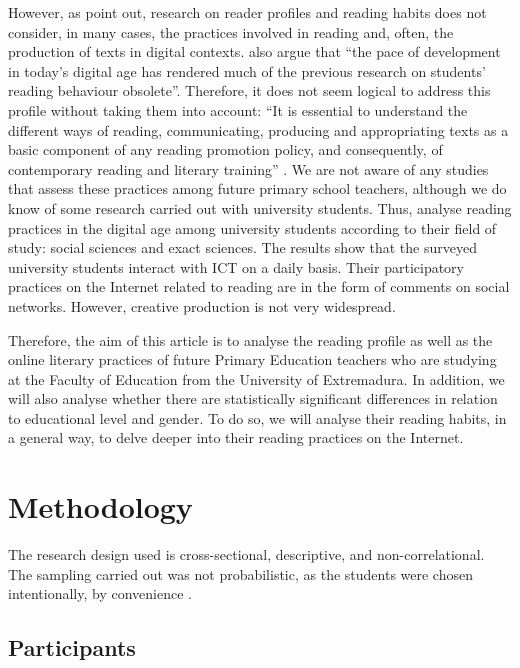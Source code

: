 \documentclass[english]{textolivre}
\begin{document}
However, as \textcite{ballester_educacion_2016} point out, research on reader profiles and reading habits does not consider, in many cases, the practices involved in reading and, often, the production of texts in digital contexts. \textcite[p. 585]{putro_profiles_2018} also argue that “the pace of development in today’s digital age has rendered much of the previous research on students' reading behaviour obsolete”. Therefore, it does not seem logical to address this profile without taking them into account: “It is essential to understand the different ways of reading, communicating, producing and appropriating texts as a basic component of any reading promotion policy, and consequently, of contemporary reading and literary training” \cite[p.154]{ballester_educacion_2016}. We are not aware of any studies that assess these practices among future primary school teachers, although we do know of some research carried out with university students. Thus, \textcite{alcocer_vazquez_practicas_2021} analyse reading practices in the digital age among university students according to their field of study: social sciences and exact sciences. The results show that the surveyed university students interact with ICT on a daily basis. Their participatory practices on the Internet related to reading are in the form of comments on social networks. However, creative production is not very widespread.

Therefore, the aim of this article is to analyse the reading profile as well as the online literary practices of future Primary Education teachers who are studying at the Faculty of Education from the University of Extremadura. In addition, we will also analyse whether there are statistically significant differences in relation to educational level and gender. To do so, we will analyse their reading habits, in a general way, to delve deeper into their reading practices on the Internet.





\section{Methodology}

The research design used is cross-sectional, descriptive, and non-correlational. The sampling carried out was not probabilistic, as the students were chosen intentionally, by convenience \cite{flyvbjerg_five_2006}.


\subsection{Participants}
\end{document}
